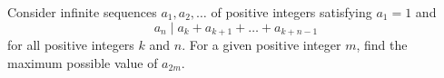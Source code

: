 Consider infinite sequences $a_1,a_2,\dots$ of positive integers satisfying $a_1=1$ and \[a_n \mid a_k+a_{k+1}+\dots+a_{k+n-1}\] for all positive integers $k$ and $n.$ For a given positive integer $m$, find the maximum possible value of $a_{2m}$.